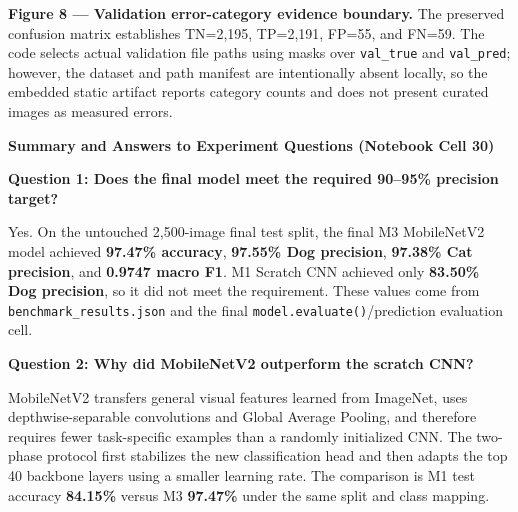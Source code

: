 \vspace{-0.3em}
\begin{tcolorbox}[colback=gray!5!white,colframe=gray!50!black,boxrule=0.5pt,arc=2pt,left=6pt,right=6pt,halign=left,before upper={\sloppy\raggedright},top=4pt,bottom=4pt,unbreakable]
\textbf{Figure 8 — Validation error-category evidence boundary.} The preserved confusion matrix establishes TN=2,195, TP=2,191, FP=55, and FN=59. The code selects actual validation file paths using masks over \texttt{val\_true} and \texttt{val\_pred}; however, the dataset and path manifest are intentionally absent locally, so the embedded static artifact reports category counts and does not present curated images as measured errors.
\end{tcolorbox}

\clearpage
\begin{tcolorbox}[colback=gray!5!white,colframe=gray!50!black,boxrule=0.5pt,arc=2pt,left=6pt,right=6pt,halign=left,before upper={\sloppy\raggedright},top=5pt,bottom=5pt,unbreakable]
\noindent\textbf{\large Summary and Answers to Experiment Questions (Notebook Cell 30)}\par\vspace{0.4em}

\noindent\textbf{\normalsize Question 1: Does the final model meet the required 90--95\% precision target?}\par\vspace{0.2em}
Yes. On the untouched 2,500-image final test split, the final M3 MobileNetV2 model achieved \textbf{97.47\% accuracy}, \textbf{97.55\% Dog precision}, \textbf{97.38\% Cat precision}, and \textbf{0.9747 macro F1}. M1 Scratch CNN achieved only \textbf{83.50\% Dog precision}, so it did not meet the requirement. These values come from \texttt{benchmark\_results.json} and the final \texttt{model.evaluate()}/prediction evaluation cell.\par\vspace{0.4em}

\noindent\textbf{\normalsize Question 2: Why did MobileNetV2 outperform the scratch CNN?}\par\vspace{0.2em}
MobileNetV2 transfers general visual features learned from ImageNet, uses depthwise-separable convolutions and Global Average Pooling, and therefore requires fewer task-specific examples than a randomly initialized CNN. The two-phase protocol first stabilizes the new classification head and then adapts the top 40 backbone layers using a smaller learning rate. The comparison is M1 test accuracy \textbf{84.15\%} versus M3 \textbf{97.47\%} under the same split and class mapping.\par\vspace{0.4em}


\end{tcolorbox}
